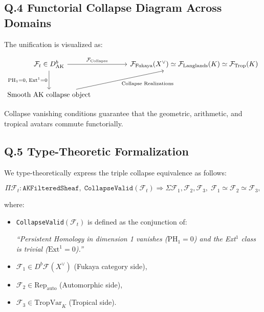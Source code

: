 \documentclass[11pt]{article}
\begin{document}
\subsection*{Q.4 Functorial Collapse Diagram Across Domains}

The unification is visualized as:

\[
\begin{tikzcd}[column sep=huge, row sep=large]
\mathcal{F}_t \in D^b_{\mathrm{AK}} \arrow[r, "{\mathcal{F}_{\mathrm{Collapse}}}"] \arrow[d, swap, "{\mathrm{PH}_1 = 0,\; \mathrm{Ext}^1 = 0}"]
& \mathcal{F}_{\mathrm{Fukaya}}(X^\vee) \simeq \mathcal{F}_{\mathrm{Langlands}}(K) \simeq \mathcal{F}_{\mathrm{Trop}}(K) \\
\text{Smooth AK collapse object} \arrow[ru, swap, "{\text{Collapse Realizations}}"] &
\end{tikzcd}
\]


Collapse vanishing conditions guarantee that the geometric, arithmetic, and tropical avatars commute functorially.

\subsection*{Q.5 Type-Theoretic Formalization}

We type-theoretically express the triple collapse equivalence as follows:

\[
\Pi \mathcal{F}_t : \texttt{AKFilteredSheaf},\;
\texttt{CollapseValid}(\mathcal{F}_t)
\Rightarrow
\Sigma \mathcal{F}_1, \mathcal{F}_2, \mathcal{F}_3,\;
\mathcal{F}_1 \simeq \mathcal{F}_2 \simeq \mathcal{F}_3,
\]

where:

\begin{itemize}
  \item \texttt{CollapseValid}$(\mathcal{F}_t)$ is defined as the conjunction of:
  \begin{center}
  \emph{“Persistent Homology in dimension 1 vanishes (\( \mathrm{PH}_1 = 0 \)) and the Ext$^1$ class is trivial (\( \mathrm{Ext}^1 = 0 \)).”}
  \end{center}
  \item $\mathcal{F}_1 \in D^b\mathcal{F}(X^\vee)$ (Fukaya category side),
  \item $\mathcal{F}_2 \in \mathrm{Rep}_{\mathrm{auto}}$ (Automorphic side),
  \item $\mathcal{F}_3 \in \mathrm{TropVar}_K$ (Tropical side).
\end{itemize}
\end{document}
